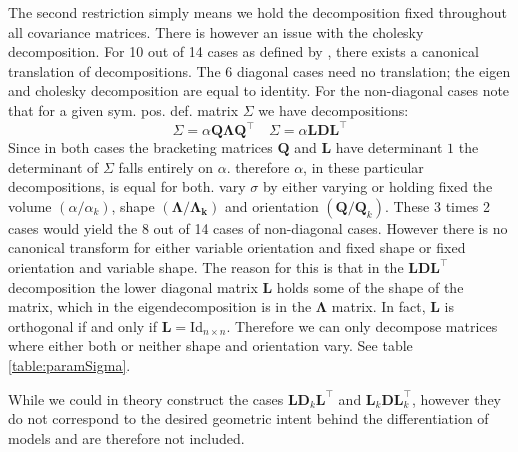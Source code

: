 The second restriction simply means we hold the decomposition fixed throughout 
all covariance matrices.
There is however an issue with the cholesky decomposition. For 10 out of 14
cases as defined by \cite{Cel95}, there exists a canonical translation of
decompositions.
The 6 diagonal cases need no translation; the eigen and cholesky decomposition
are equal to identity.
For the non-diagonal cases note that for a given sym. pos. def. matrix
$ \Sigma $ we have decompositions:
\[\Sigma = \alpha \pmb{Q \Lambda Q}^\top \quad \Sigma =\alpha \pmb{L D L}^\top\]
Since in both cases the bracketing matrices $ \pmb{Q} $ and $ \pmb{L} $ have 
determinant $ 1 $ the determinant of $ \Sigma $ falls entirely on $ \alpha $.
therefore $ \alpha $, in these particular decompositions, is equal for both.
\cite{Cel95} vary $\sigma$ by either varying or holding fixed the volume 
$(\alpha / \alpha_k)$, shape $(\pmb{\Lambda} / \pmb{\Lambda_k})$ and orientation
$(\pmb{Q} / \pmb{Q}_k)$.
These 3 times 2 cases would yield the 8 out of 14 cases of non-diagonal cases.
However there is no canonical transform for either variable orientation and 
fixed shape or fixed orientation and variable shape.
The reason for this is that in the $\pmb{LDL}^\top$ decomposition the lower
diagonal matrix $\pmb{L}$ holds some of the shape of the matrix, which in 
the eigendecomposition is in the $\pmb{\Lambda}$ matrix.
In fact, $\pmb{L}$ is orthogonal if and only if 
$\pmb{L} = \mathrm{Id}_{n\times n}$.
Therefore we can only decompose matrices where either both or neither shape and
orientation vary. See table \ref{table:paramSigma}.

While we could in theory construct the cases $\pmb{L}\pmb{D}_k\pmb{L}^\top$ and
$\pmb{L}_k \pmb{D} \pmb{L}_k^\top$, however they do not correspond to the desired
geometric intent behind the differentiation of models and are therefore not 
included.


